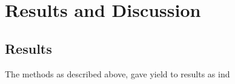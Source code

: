\chapter{Results and Discussion}
\label{chp:4}


\section{Results}

The methods as described above, gave yield to results as ind






